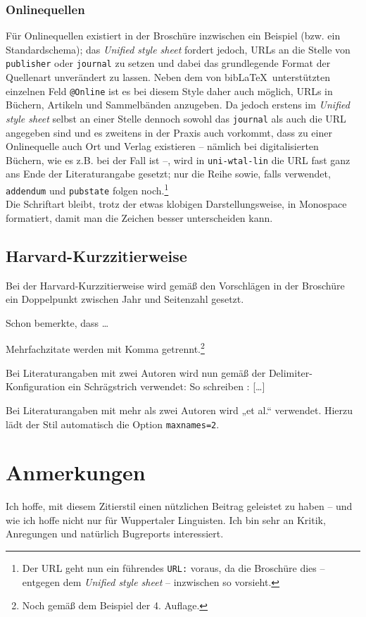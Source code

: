 \documentclass[12pt,notitlepage,parskip]{scrartcl}
\begin{document}
\subsubsection{Onlinequellen}
Für Onlinequellen existiert in der Broschüre inzwischen ein Beispiel (bzw. ein
Standardschema); das \textit{Unified style sheet} fordert jedoch, URLs an die
Stelle von \texttt{publisher} oder \texttt{journal} zu setzen und dabei das
grundlegende Format der Quellenart unverändert zu lassen. Neben dem von
bib\LaTeX\ unterstützten einzelnen Feld \texttt{@Online} ist es bei diesem Style
daher auch möglich, URLs in Büchern, Artikeln und Sammelbänden anzugeben. Da
jedoch erstens im \textit{Unified style sheet} selbst an einer Stelle dennoch
sowohl das \texttt{journal} als auch die URL angegeben sind und es zweitens in
der Praxis auch vorkommt, dass zu einer Onlinequelle auch Ort und Verlag
existieren – nämlich bei digitalisierten Büchern, wie es z.B.
bei \textcite{sievers} der Fall ist –, wird in \texttt{uni-wtal-lin} die URL
fast ganz ans Ende der Literaturangabe gesetzt; nur die Reihe sowie, falls
verwendet, \texttt{addendum} und \texttt{pubstate} folgen noch.\footnote{Der URL
geht nun ein führendes \texttt{URL:} voraus, da die Broschüre dies – entgegen
dem \textit{Unified style sheet} – inzwischen so vorsieht.}\\
Die Schriftart bleibt, trotz der etwas klobigen Darstellungsweise, in Monospace
formatiert, damit man die Zeichen besser unterscheiden kann.

\subsection{Harvard-Kurzzitierweise}
Bei der Harvard-Kurzzitierweise wird gemäß den Vorschlägen in der Broschüre
ein Doppelpunkt zwischen Jahr und Seitenzahl gesetzt.

Schon \textcite[34]{swallow2} bemerkte, dass \ldots

Mehrfachzitate werden mit Komma getrennt.\footnote{Noch gemäß dem Beispiel
der 4. Auflage.} \parencites{schatz1}{schatz2}

Bei Literaturangaben mit zwei Autoren wird nun gemäß der
Delimiter-Konfiguration ein Schrägstrich verwendet: So schreiben
\textcite{swallow1}: [\ldots]

Bei Literaturangaben mit mehr als zwei Autoren wird „et al.“ verwendet. Hierzu
lädt der Stil automatisch die Option \texttt{maxnames=2}.
\parencite[Vgl.][21]{haupt}


\section{Anmerkungen}
Ich hoffe, mit diesem Zitierstil einen nützlichen Beitrag geleistet zu haben –
und wie ich hoffe nicht nur für Wuppertaler Linguisten. Ich bin sehr an Kritik,
Anregungen und natürlich Bugreports interessiert.
\end{document}
